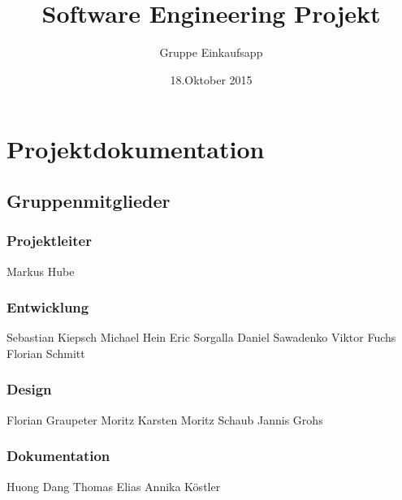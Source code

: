 \documentclass[12pt,a4paper]{article}
\begin{document}
\title{Software Engineering Projekt}
\author{Gruppe Einkaufsapp}
\date {18.Oktober 2015}
\maketitle
\newpage
\tableofcontents
\newpage
\section*{Projektdokumentation}
\subsection*{Gruppenmitglieder}
\subsubsection*{Projektleiter}
Markus Hube
\subsubsection*{Entwicklung}
Sebastian Kiepsch
\newline
Michael Hein
\newline
Eric Sorgalla
\newline
Daniel Sawadenko 
\newline
Viktor Fuchs
\newline
Florian Schmitt 
\subsubsection*{Design}
Florian Graupeter
\newline
Moritz Karsten
\newline
Moritz Schaub
\newline
Jannis Grohs
\subsubsection*{Dokumentation}
Huong Dang
\newline
Thomas Elias
\newline
Annika Köstler
\newpage
\end{document}
